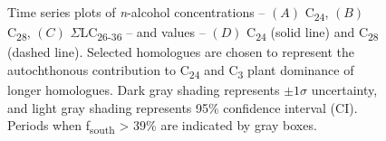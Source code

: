 \begin{figure}[p]
	\caption[\textit{n}-alcohol concentration and  time-series plots]{Time series plots of \textit{n}-alcohol concentrations -- $(A)$ C\textsubscript{24}, $(B)$ C\textsubscript{28}, $(C)$ $\Sigma$LC\textsubscript{26-36} -- and  values -- $(D)$ C\textsubscript{24} (solid line) and C\textsubscript{28} (dashed line). Selected homologues are chosen to represent the autochthonous contribution to C\textsubscript{24} and C\textsubscript{3} plant dominance of longer homologues. Dark gray shading represents $\pm 1\sigma$ uncertainty, and light gray shading represents 95\% confidence interval (CI). Periods when f\textsubscript{south} > 39\% are indicated by gray boxes.}
	\label{Ch4Fig:6} 
\end{figure}

